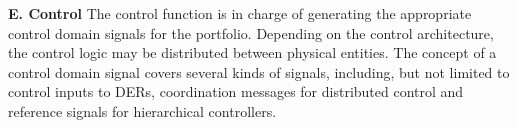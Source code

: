 \textbf{E. Control}
The control function is in charge of generating the appropriate control domain signals for the portfolio. Depending on the control architecture, the control logic may be distributed between physical entities. The concept of a control domain signal covers several kinds of signals, including, but not limited to control inputs to DERs, coordination messages for distributed control and reference signals for hierarchical controllers.
